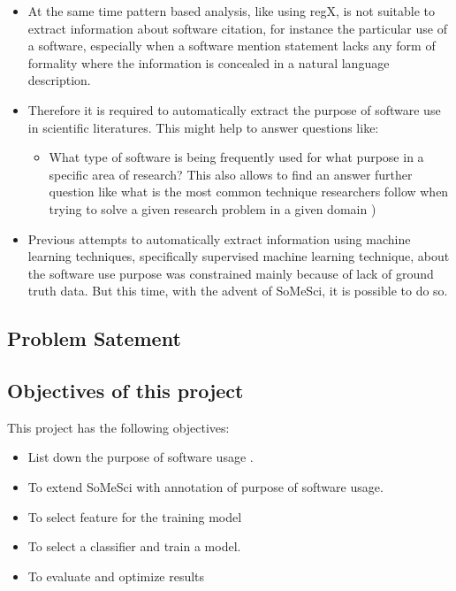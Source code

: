 \begin{itemize}
\begin{itemize}
			\end{itemize}

	\item At the same time pattern based analysis, like using regX, is not suitable to extract information about software citation, for instance the particular use of a software, especially when a software mention statement lacks any form of formality where the information is concealed in a natural language description. 
	\item Therefore it is required to automatically extract the purpose of software use in scientific literatures. This might help to answer questions like:
		
		\begin{itemize}
			\item What type of software is being frequently used for what purpose in a specific area of research? This also allows to find an answer further question like what is  the most common technique researchers follow when trying to solve a given research problem in a given domain )


		\end{itemize}	
	\item Previous attempts to automatically extract information using machine learning techniques, specifically supervised machine learning technique, about the software use purpose was constrained mainly because of lack of ground truth data. But this time, with the advent of SoMeSci, it is possible to do so. 	
	
\end{itemize}


\subsection{Problem Satement}
\subsection{Objectives of this project}
This project has the following objectives:
		
		\begin{itemize}[noitemsep,topsep=5pt]   %
	
			\item List down the purpose of software usage .
			\item To extend SoMeSci with annotation of purpose of software usage. 
			\item To select feature for the training model
			\item To select a classifier and train a model.
			\item To evaluate and optimize results 

		\end{itemize}	

\clearpage
